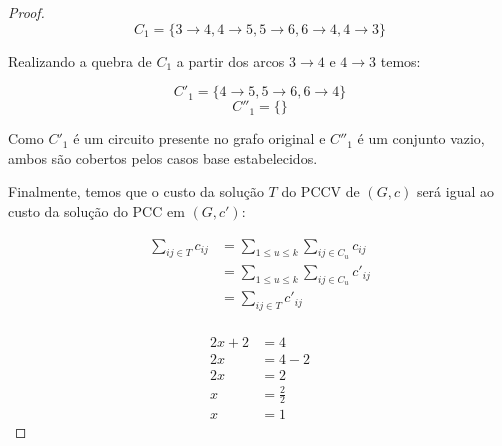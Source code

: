 \begin{proof}
            \[
                C_1 = \{ 3\rightarrow 4, 4\rightarrow 5, 5\rightarrow 6, 6\rightarrow 4, 4\rightarrow 3 \}                
            \]

            Realizando a quebra de $C_1$ a partir dos arcos $3 \rightarrow 4$ e $4 \rightarrow 3$ temos:

            \[
                C'_1  = \{4 \rightarrow 5, 5\rightarrow 6, 6\rightarrow 4\}
            \]
            \[
                C''_1 = \{\}
            \] 

            Como $C'_1$ é um circuito presente no grafo original e $C''_1$ é um conjunto vazio, ambos são cobertos pelos casos base estabelecidos.

            Finalmente, temos que o custo da solução $T$ do PCCV de $(G, c)$ será igual ao custo da solução do PCC em $(G, c')$:

            \begin{align*}
                \sum_{ij \in T} c_{ij} &= \sum_{1 \leq u \leq k} \sum_{ij \in C_u} c_{ij} \\
                                       &= \sum_{1 \leq u \leq k} \sum_{ij \in C_u} c'_{ij} \\
                                       &= \sum_{ij \in T} c'_{ij} \\
            \end{align*}

            \begin{align*}
                2x + 2 &= 4 \\
                2x &= 4 - 2 \\
                2x &= 2 \\
                x &= \frac{2}{2} \\
                x &= 1
            \end{align*}

        \end{proof}

%
%
